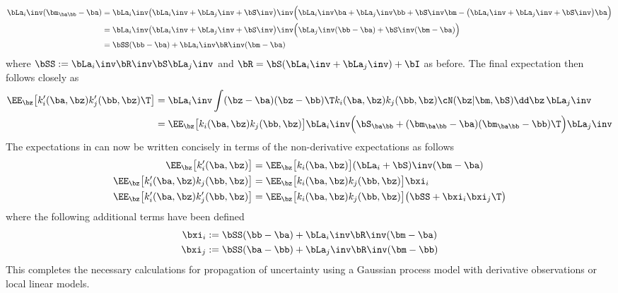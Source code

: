 \begin{align*}
\bLa_i\inv (\bm_{\ba\bb} - \ba)
&= \bLa_i\inv \big(\bLa_i\inv + \bLa_j\inv + \bS\inv \big)\inv
\Big( \bLa_i\inv\ba + \bLa_j\inv\bb + \bS\inv\bm - \big(\bLa_i\inv + \bLa_j\inv + \bS\inv\big)\ba \Big) \\
&= \bLa_i\inv \big(\bLa_i\inv + \bLa_j\inv + \bS\inv \big)\inv
\Big( \bLa_j\inv(\bb-\ba) + \bS\inv(\bm-\ba) \Big) \\
&= \bSS(\bb - \ba) + \bLa_i\inv \bR\inv(\bm - \ba)
\end{align*}
where $\bSS := \bLa_i\inv \bR\inv \bS\bLa_j\inv$ and $\bR = \bS(\bLa_i\inv + \bLa_j\inv) + \bI$ as before. 
The final expectation then follows closely as
\begin{align}
\nonumber \EE_{\bz}\big[k'_i(\ba,\bz)k_j'(\bb,\bz)\T\big] 
&= \bLa_i\inv \int (\bz - \ba)(\bz - \bb)\T k_i(\ba,\bz)k_j(\bb,\bz) \cN(\bz|\bm, \bS) \dd\bz\, \bLa_j\inv \\
&= \EE_{\bz}\big[k_i(\ba,\bz)k_j(\bb,\bz) \big]
\bLa_i\inv \Big( \bS_{\ba\bb} + (\bm_{\ba\bb} - \ba)(\bm_{\ba\bb} - \bb)\T \Big) \bLa_j\inv  
\label{eqn:d3exp}
\end{align}
The expectations in  can now be written concisely in terms of the non-derivative expectations as  follows
\begin{align}
\EE_{\bz}\big[k_i'(\ba,\bz)\big] &= \EE_{\bz}\big[k_i(\ba,\bz)\big] (\bLa_i+\bS)\inv(\bm - \ba) \\
%
\EE_{\bz}\big[k'_i(\ba,\bz)k_j(\bb,\bz)\big]
&= \EE_{\bz}\big[k_i(\ba,\bz)k_j(\bb,\bz)\big] \bxi_i \\
%
\EE_{\bz}\big[k'_i(\ba,\bz)k_j'(\bb,\bz)\big]
&= \EE_{\bz}\big[k_i(\ba,\bz)k_j(\bb,\bz)\big] \big(\bSS + \bxi_i\bxi_j\T\big)
\end{align}
where the following additional terms have been defined
\begin{align*}
\bxi_i &:= \bSS(\bb - \ba) + \bLa_i\inv \bR\inv(\bm - \ba) \\
\bxi_j &:= \bSS(\ba - \bb) + \bLa_j\inv \bR\inv(\bm - \bb)
\end{align*}
This completes the necessary calculations for propagation of uncertainty using a Gaussian process model with derivative observations or local linear models.





